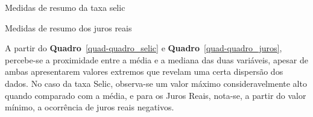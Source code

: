 \documentclass[
  portuguese,
]{estat}
\begin{document}
\begin{quadro}[H]

\caption{\label{quad-quadro_selic}Medidas de resumo da taxa selic}


\end{quadro}%

\begin{quadro}[H]

\caption{\label{quad-quadro_juros}Medidas de resumo dos juros reais}


\end{quadro}%

A partir do \textbf{Quadro}~\ref{quad-quadro_selic} e
\textbf{Quadro}~\ref{quad-quadro_juros}, percebe-se a proximidade entre
a média e a mediana das duas variáveis, apesar de ambas apresentarem
valores extremos que revelam uma certa dispersão dos dados. No caso da
taxa Selic, observa-se um valor máximo consideravelmente alto quando
comparado com a média, e para os Juros Reais, nota-se, a partir do valor
mínimo, a ocorrência de juros reais negativos.
\end{document}
